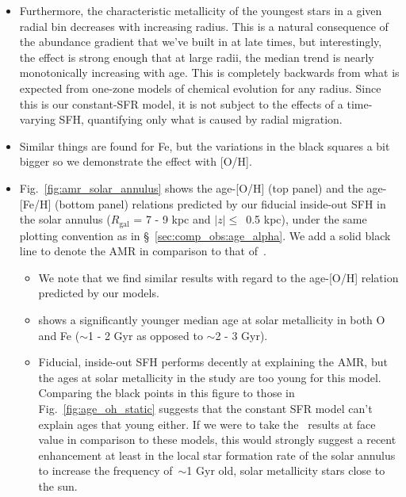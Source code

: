 \documentclass[fleqn, usenatbib]{mnras}
\begin{document}
\begin{itemize}
	\item Furthermore, the characteristic metallicity of the youngest stars 
	in a given radial bin decreases with increasing radius. This is a natural 
	consequence of the abundance gradient that we've built in at late times, 
	but interestingly, the effect is strong enough that at large radii, the 
	median trend is nearly monotonically increasing with age. This is 
	completely backwards from what is expected from one-zone models of 
	chemical evolution for any radius. Since this is our constant-SFR model, 
	it is not subject to the effects of a time-varying SFH, quantifying only 
	what is caused by radial migration. 

	\item Similar things are found for Fe, but the variations in the black 
	squares a bit bigger so we demonstrate the effect with [O/H]. 

	\item Fig.~\ref{fig:amr_solar_annulus} shows the age-[O/H] (top panel) 
	and the age-[Fe/H] (bottom panel) relations predicted by our fiducial 
	inside-out SFH in the solar annulus ($R_\text{gal}$ = 7 - 9 kpc and 
	$\left|z\right|\leq$~0.5 kpc), under the same plotting convention as in 
	\S~\ref{sec:comp_obs:age_alpha}. We add a solid black line to denote the 
	\citet{Feuillet2018} AMR in comparison to that of~\citet{Feuillet2019}. 
	\begin{itemize} 
		\item We note that we find similar results with regard to the 
		age-[O/H] relation predicted by our models. 

		\item \citet{Feuillet2018} shows a significantly younger median age at 
		solar metallicity in both O and Fe ($\sim$1 - 2 Gyr as opposed to 
		$\sim$2 - 3 Gyr). 

		\item Fiducial, inside-out SFH performs decently at explaining the 
		\citet{Feuillet2019} AMR, but the ages at solar metallicity in the 
		\citet{Feuillet2018} study are too young for this model. Comparing the 
		black points in this figure to those in Fig.~\ref{fig:age_oh_static} 
		suggests that the constant SFR model can't explain ages that young 
		either. If we were to take the~\citet{Feuillet2018} results at face 
		value in comparison to these models, this would strongly suggest a 
		recent enhancement at least in the local star formation rate of the 
		solar annulus to increase the frequency of~$\sim$1 Gyr old, solar 
		metallicity stars close to the sun. 


\end{itemize}
\end{itemize}
\end{document}
